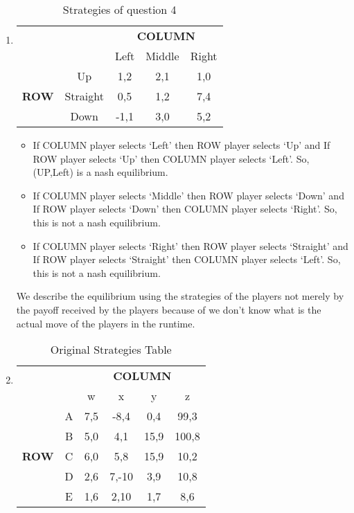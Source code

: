 \documentclass[a4paper,12pt]{article}
\begin{document}
\begin{enumerate}
\item%
\begin{table}[H]
\centering
\begin{tabular}{@{}ccccc@{}}
\toprule
\multicolumn{2}{c}{} & \multicolumn{3}{c}{\bfseries COLUMN}\\
\multicolumn{2}{c}{} & Left & Middle & Right\\
\multirow{3}{*}{\bfseries ROW} & Up & 1,2 & 2,1 & 1,0\\
 & Straight & 0,5 & 1,2 & 7,4\\
 & Down & -1,1 & 3,0 & 5,2\\
 \bottomrule
\end{tabular}
\caption{Strategies of question 4}
\end{table}
\begin{itemize}
\item
If COLUMN player selects `Left' then ROW player selects `Up' and If ROW player selects `Up' then COLUMN player selects `Left'. So, (UP,Left) is a nash equilibrium.
\item
If COLUMN player selects `Middle' then ROW player selects `Down' and If ROW player selects `Down' then COLUMN player selects `Right'. So, this is not a nash equilibrium.
\item
If COLUMN player selects `Right' then ROW player selects `Straight' and If ROW player selects `Straight' then COLUMN player selects `Left'. So, this is not a nash equilibrium.
\end{itemize}
We describe the equilibrium using the strategies of the players not merely by the payoff received by the players because of we don't know what is the actual move of the players in the runtime.
\item%
\begin{table}[H]
\centering
\begin{tabular}{@{}cccccc@{}}
\toprule
\multicolumn{2}{c}{} & \multicolumn{4}{c}{\bfseries COLUMN}\\
\multicolumn{2}{c}{} & w & x & y & z\\
\multirow{5}{*}{\bfseries ROW} & A & 7,5 & -8,4 & 0,4 & 99,3\\
 & B & 5,0 & 4,1 & 15,9 & 100,8\\
 & C & 6,0 & 5,8 & 15,9 & 10,2\\
 & D & 2,6 & 7,-10 & 3,9 & 10,8\\
 & E & 1,6 & 2,10 & 1,7 & 8,6\\
 \bottomrule
\end{tabular}
\caption{Original Strategies Table}
\end{table}


\end{enumerate}
\end{document}
